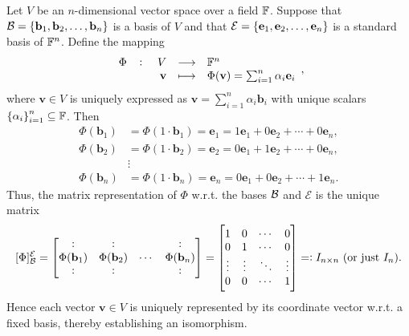 \documentclass[11pt,openany]{article}
\renewcommand{\vec}[1]{\mathbf{#1}}
\begin{document}
\begin{example*}
\begin{center}
\begin{tikzpicture}[scale=1, >=Stealth]
		\end{tikzpicture}
	\end{center}
	\vfill
	Let \(V\) be an \(n\)-dimensional vector space over a field \(\F\). Suppose that \(\basis=\{\vec{b}_1, \vec{b}_2, \dots, \vec{b}_n\}\) is a basis of $V$ and that $\mathcal{E}=\set{\vec{e}_1,\vec{e}_2,\dots,\vec{e}_n}$ is a standard basis of $\F^n$. 
	Define the mapping \[
	\fullfunction{\Phi}{V}{\F^n}{\vec{v}}{\Phi(\vec{v})=\sum_{i=1}^{n}\alpha_i\vec{e}_i},
	\] where $\vec{v}\in V$ is uniquely expressed as $\vec{v}=\sum_{i=1}^{n}\alpha_i\vec{b}_i$ with unique scalars $\set{\alpha_i}_{i=1}^n\subseteq\F$. Then 
	\begin{align*}
		\Phi(\vec{b}_1)&=\Phi(1\cdot\vec{b}_1)=\vec{e}_1=1\vec{e}_1+0\vec{e}_2+\cdots+0\vec{e}_n,\\
		\Phi(\vec{b}_2)&=\Phi(1\cdot\vec{b}_2)=\vec{e}_2=0\vec{e}_1+1\vec{e}_2+\cdots+0\vec{e}_n,\\
		&\vdots \\
		\Phi(\vec{b}_n)&=\Phi(1\cdot\vec{b}_n)=\vec{e}_n=0\vec{e}_1+0\vec{e}_2+\cdots+1\vec{e}_n.
	\end{align*}
	Thus, the matrix representation of $\Phi$ w.r.t. the bases $\basis$ and $\mathcal{E}$ is the unique matrix \[
	[\Phi]_{\basis}^{\mathcal{E}}=\begin{bmatrix}
		: & : & & : \\
		\Phi(\vec{b}_1) & \Phi(\vec{b}_2) & \cdots & \Phi(\vec{b}_n) \\
		: & : & & : \\
	\end{bmatrix}=\begin{bmatrix}
		1 & 0 & \cdots & 0\\
		0 & 1 & \cdots & 0\\
		\vdots & \vdots & \ddots &\vdots  \\
		0 & 0 & \cdots & 1\\
	\end{bmatrix}=:I_{n\times n}\ (\text{or just $I_n$}).
	\] Hence each vector \(\vec{v} \in V\) is uniquely represented by its coordinate vector w.r.t. a fixed basis, thereby establishing an isomorphism.
\end{example*}
\end{document}
